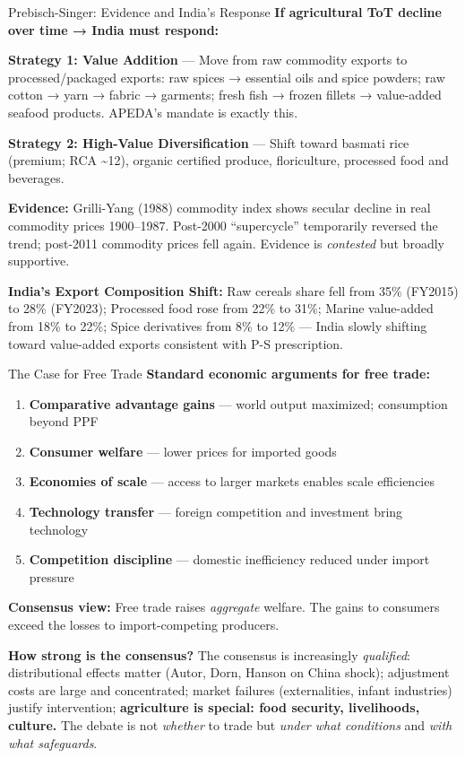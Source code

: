 \documentclass[
  ignorenonframetext,
  aspectratio=169,
]{beamer}
\makeatletter
\providecommand{\tightlist}{%
  \setlength{\itemsep}{0pt}\setlength{\parskip}{0pt}}
\let\quarto@originallabel\label
\DeclareRobustCommand*{\label}[1]{\quarto@originallabel{#1}}
\makeatother
\begin{document}
\begin{frame}{Prebisch-Singer: Evidence and India's Response}
\label{prebisch-singer-evidence-and-indias-response}
\textbf{If agricultural ToT decline over time → India must respond:}

\textbf{Strategy 1: Value Addition} --- Move from raw commodity exports
to processed/packaged exports: raw spices → essential oils and spice
powders; raw cotton → yarn → fabric → garments; fresh fish → frozen
fillets → value-added seafood products. APEDA's mandate is exactly this.

\textbf{Strategy 2: High-Value Diversification} --- Shift toward basmati
rice (premium; RCA \textasciitilde12), organic certified produce,
floriculture, processed food and beverages.

\textbf{Evidence:} Grilli-Yang (1988) commodity index shows secular
decline in real commodity prices 1900--1987. Post-2000 ``supercycle''
temporarily reversed the trend; post-2011 commodity prices fell again.
Evidence is \emph{contested} but broadly supportive.

\textbf{India's Export Composition Shift:} Raw cereals share fell from
35\% (FY2015) to 28\% (FY2023); Processed food rose from 22\% to 31\%;
Marine value-added from 18\% to 22\%; Spice derivatives from 8\% to 12\%
--- India slowly shifting toward value-added exports consistent with P-S
prescription.
\end{frame}

\begin{frame}{The Case for Free Trade}
\label{the-case-for-free-trade}
\textbf{Standard economic arguments for free trade:}

\begin{enumerate}
\tightlist
\item
  \textbf{Comparative advantage gains} --- world output maximized;
  consumption beyond PPF
\item
  \textbf{Consumer welfare} --- lower prices for imported goods
\item
  \textbf{Economies of scale} --- access to larger markets enables scale
  efficiencies
\item
  \textbf{Technology transfer} --- foreign competition and investment
  bring technology
\item
  \textbf{Competition discipline} --- domestic inefficiency reduced
  under import pressure
\end{enumerate}

\textbf{Consensus view:} Free trade raises \emph{aggregate} welfare. The
gains to consumers exceed the losses to import-competing producers.

\textbf{How strong is the consensus?} The consensus is increasingly
\emph{qualified}: distributional effects matter (Autor, Dorn, Hanson on
China shock); adjustment costs are large and concentrated; market
failures (externalities, infant industries) justify intervention;
\textbf{agriculture is special: food security, livelihoods, culture.}
The debate is not \emph{whether} to trade but \emph{under what
conditions} and \emph{with what safeguards}.
\end{frame}
\end{document}
